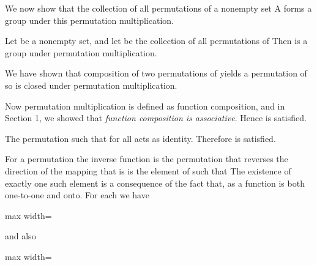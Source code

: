\documentclass[11pt,oneside]{article}
\begin{document}
\begin{BookBody}

We now show that the collection of all permutations of a nonempty set A forms a group under this permutation multiplication.

 Let  be a nonempty set, and let  be the collection of all permutations of  Then  is a group under permutation multiplication.

 We have shown that composition of two permutations of  yields a permutation of  so  is closed under permutation multiplication.

Now permutation multiplication is defined as function composition, and in Section 1, we showed that\textit{ function composition is associative}. Hence  is satisfied.

The permutation \BookInline{\iota } such that  for all  acts as identity. Therefore  is satisfied.

For a permutation \BookInline{\sigma,\allowbreak } the inverse function is the permutation that reverses the direction of the mapping \BookInline{\sigma,\allowbreak } that is is the element  of  such that  The existence of exactly one such element  is a consequence of the fact that, as a function\BookInline{,\allowbreak \sigma } is both one-to-one and onto. For each  we have

\begin{center}\begin{adjustbox}{max width=\linewidth}\end{adjustbox}\end{center}

\noindent and also

\begin{center}\begin{adjustbox}{max width=\linewidth}\end{adjustbox}\end{center}


\end{BookBody}
\end{document}

